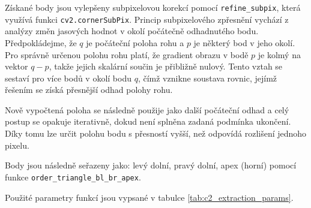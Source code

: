 \documentclass[male,czech,api_bc]{kitheses}
\begin{document}
Získané body jsou vylepšeny subpixelovou korekcí pomocí \texttt{refine\_subpix}, která využívá funkci \texttt{cv2.cornerSubPix}. Princip subpixelového zpřesnění vychází z analýzy změn jasových hodnot v okolí počátečně odhadnutého bodu. Předpokládejme, že \(q\) je počáteční poloha rohu a \(p\) je některý bod v jeho okolí. Pro správně určenou polohu rohu platí, že gradient obrazu v bodě \(p\) je kolmý na vektor \(q - p\), takže jejich skalární součin je přibližně nulový. Tento vztah se sestaví pro více bodů v okolí bodu \(q\), čímž vznikne soustava rovnic, jejímž řešením se získá přesnější odhad polohy rohu.

Nově vypočtená poloha se následně použije jako další počáteční odhad a celý postup se opakuje iterativně, dokud není splněna zadaná podmínka ukončení. Díky tomu lze určit polohu bodu s přesností vyšší, než odpovídá rozlišení jednoho pixelu.

Body jsou následně seřazeny jako: levý dolní, pravý dolní, apex (horní) pomocí funkce \texttt{order\-\_triangle\-\_bl\_br\_apex}.

Použité parametry funkcí jsou vypsané v tabulce \ref{tab:c2_extraction_params}.
\end{document}
